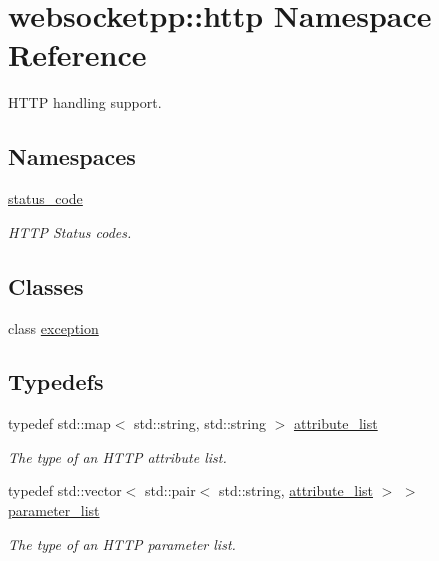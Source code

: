 \hypertarget{namespacewebsocketpp_1_1http}{}\section{websocketpp\+:\+:http Namespace Reference}
\label{namespacewebsocketpp_1_1http}


H\+T\+TP handling support.  


\subsection*{Namespaces}
\begin{DoxyCompactItemize}
\item 
 \hyperlink{namespacewebsocketpp_1_1http_1_1status__code}{status\+\_\+code}
\begin{DoxyCompactList}\small\item\em H\+T\+TP Status codes. \end{DoxyCompactList}\end{DoxyCompactItemize}
\subsection*{Classes}
\begin{DoxyCompactItemize}
\item 
class \hyperlink{classwebsocketpp_1_1http_1_1exception}{exception}
\end{DoxyCompactItemize}
\subsection*{Typedefs}
\begin{DoxyCompactItemize}
\item 
typedef std\+::map$<$ std\+::string, std\+::string $>$ \hyperlink{namespacewebsocketpp_1_1http_a9744f4104772b987aa9e86c35ce1357b}{attribute\+\_\+list}
\begin{DoxyCompactList}\small\item\em The type of an H\+T\+TP attribute list. \end{DoxyCompactList}\item 
typedef std\+::vector$<$ std\+::pair$<$ std\+::string, \hyperlink{namespacewebsocketpp_1_1http_a9744f4104772b987aa9e86c35ce1357b}{attribute\+\_\+list} $>$ $>$ \hyperlink{namespacewebsocketpp_1_1http_a2c285bc959df5a63bf962bed842fccfb}{parameter\+\_\+list}
\begin{DoxyCompactList}\small\item\em The type of an H\+T\+TP parameter list. \end{DoxyCompactList}\end{DoxyCompactItemize}
